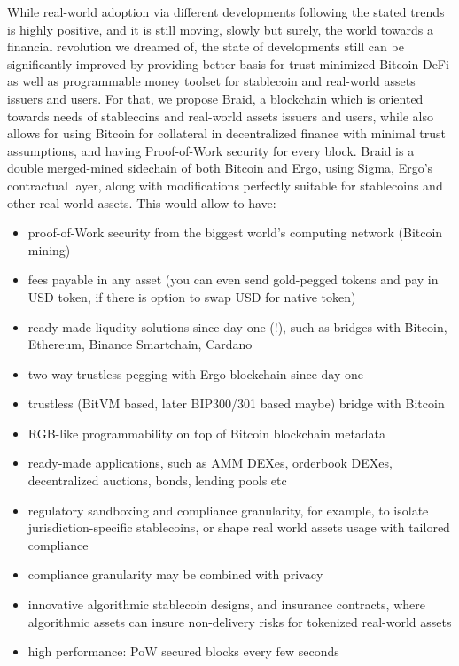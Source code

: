 \documentclass{llncs}   %
\newcommand{\bc}{Braid}
\begin{document}
While real-world adoption via different developments following the stated trends is highly positive, and it is still moving, slowly but surely, the world towards a financial revolution we dreamed of, the state of developments still can be significantly improved by providing better basis for trust-minimized  Bitcoin DeFi as well as programmable money toolset for stablecoin and real-world assets issuers and users. For that, we propose \bc{}, a blockchain which is oriented towards needs of stablecoins and real-world assets  issuers and users, while also allows for using Bitcoin for collateral in decentralized finance with minimal trust assumptions, and having Proof-of-Work security for every block. \bc{} is a double merged-mined sidechain of both Bitcoin and Ergo, using Sigma, Ergo's contractual layer, along with modifications perfectly suitable for stablecoins and other real world assets. This would allow to have:

\begin{itemize}
  \item proof-of-Work security from the biggest world's computing network (Bitcoin mining)
  \item fees payable in any asset (you can even send gold-pegged tokens and pay in USD token, if there is option to swap USD for native token)
  \item ready-made liqudity solutions since day one (!), such as bridges with Bitcoin, Ethereum, Binance Smartchain, Cardano
  \item two-way trustless pegging with Ergo blockchain since day one
  \item trustless (BitVM based, later BIP300/301 based maybe) bridge with Bitcoin
  \item RGB-like programmability on top of Bitcoin blockchain metadata
  \item ready-made applications, such as AMM DEXes, orderbook DEXes, decentralized auctions, bonds, lending pools etc
  \item regulatory sandboxing and compliance granularity, for example, to isolate jurisdiction-specific stablecoins, or shape real world assets usage with tailored compliance
  \item compliance granularity may be combined with privacy
  \item innovative algorithmic stablecoin designs, and insurance contracts, where algorithmic assets can insure non-delivery risks for tokenized real-world assets
  \item high performance: PoW secured blocks every few seconds
\end{itemize}
\end{document}
